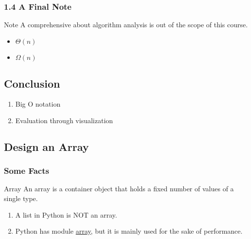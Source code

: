 \documentclass[aspectratio=169, 14pt]{beamer}
\begin{document}
\begin{frame}
	\frametitle{1.4 A Final Note}
	\begin{alertblock}{Note}
		A comprehensive about algorithm analysis is out of the scope of this course.
	\end{alertblock}

	\begin{itemize}
		\item $\Theta(n)$
		\item $\Omega(n)$
	\end{itemize}
\end{frame}


\begin{frame}
	\section{\textcolor{darkmidnightblue}{Conclusion}}

	\begin{enumerate}
		\item Big O notation
		\item Evaluation through visualization
	\end{enumerate}
\end{frame}

{
\begin{frame}
	\section{\textcolor{darkmidnightblue}{Design an Array}}
\end{frame}
}

\begin{frame}
	\frametitle{Some Facts}
	\begin{exampleblock}{Array}
		An array is a container object that holds a fixed number of values of a single type.
	\end{exampleblock}
	\begin{enumerate}
		\item A list in Python is NOT an array.
		\item Python has module \href{https://docs.python.org/3/library/array.html}{array}, but it is mainly used for the sake of performance.
	\end{enumerate}
\end{frame}
\end{document}
